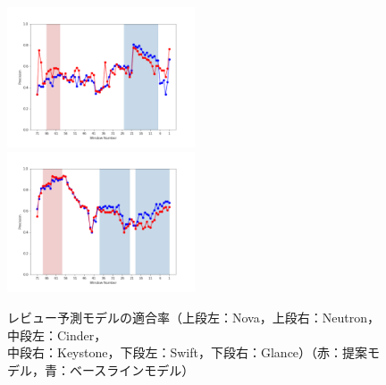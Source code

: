 \documentclass[submit]{ipsj}
\begin{document}
\begin{figure}[t]
\begin{minipage}{\textwidth}
\begin{center}
    \includegraphics[width=0.495\textwidth]{Uenaka_fig/RQ2_result/Swift/Swift_review_Precision.pdf}
    \includegraphics[width=0.495\textwidth]{Uenaka_fig/RQ2_result/Glance/Glance_review_Precision.pdf}
    \caption{レビュー予測モデルの適合率（上段左：Nova，上段右：Neutron，中段左：Cinder，\\ 中段右：Keystone，下段左：Swift，下段右：Glance）（赤：提案モデル，青：ベースラインモデル）}
    \label{fig:review_p}
\end{center}
\vspace{0.08\textheight}
\end{minipage}
\end{figure}
\end{document}
